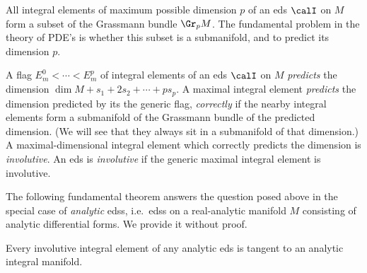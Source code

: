 All integral elements of maximum possible dimension $p$ of an \gls{eds} $\calI$ on $M$ form a subset of the Grassmann bundle $\Gr_p M$. The fundamental problem in the theory of PDE's is whether this subset is a submanifold, and to predict its dimension $p$.

\begin{defn}
    A flag $E^0_m<\cdots <E^p_m$ of integral elements of an \gls{eds} $\calI$ on $M$ \emph{predicts} the dimension $\dim M+s_1+2s_2+\cdots+p s_p$. A maximal integral element \emph{predicts} the dimension predicted by its the generic flag, \emph{correctly} if the nearby integral elements form a submanifold of the Grassmann bundle of the predicted dimension. (We will see that they always sit in a submanifold of that dimension.) A maximal-dimensional integral element which correctly predicts the dimension is \emph{involutive}. An \gls{eds} is \emph{involutive} if the generic maximal integral element is involutive.
\end{defn}

The following fundamental theorem answers the question posed above in the special case of \emph{analytic} \glspl{eds}, i.e.\ \glspl{eds} on a real-analytic manifold $M$ consisting of analytic differential forms. We provide it without proof.

\begin{thm}\label{thm Cartan-Kahler}
    Every involutive integral element of any analytic \gls{eds} is tangent to an analytic integral manifold.
\end{thm}

